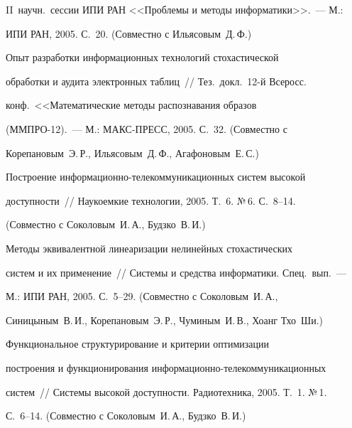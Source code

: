 II~научн.\ сессии ИПИ РАН <<Проблемы и методы информатики>>.~--- М.:


ИПИ РАН, 2005. С.~20. (Совместно с Ильясовым~Д.\,Ф.)





 Опыт разработки информационных технологий стохастической


обработки и аудита электронных таблиц~// Тез.\ докл.\ 12-й Всеросс.\


конф.\ <<Математические методы распознавания образов


 (ММПРО-12).~--- М.: МАКС-ПРЕСС, 2005. С.~32. (Совместно с


Корепановым~Э.\,Р., Ильясовым~Д.\,Ф., Агафоновым~Е.\,С.)





 Построение информационно-телекоммуникационных систем высокой


доступности~// Наукоемкие технологии, 2005. Т.~6. №\,6. С.~8--14.


(Совместно с Соколовым~И.\,А., Будзко~В.\,И.)





 Методы эквивалентной линеаризации нелинейных стохастических


систем и их применение~// Системы и средства информатики. Спец.\ вып.~---


М.: ИПИ РАН, 2005. С.~5--29. (Совместно с Соколовым~И.\,А.,


Синицыным~В.\,И., Корепановым~Э.\,Р., Чуминым~И.\,В., Хоанг Тхо~Ши.)
















 Функциональное структурирование и критерии оптимизации


построения и функционирования ин\-фор\-ма\-ци\-он\-но-те\-ле\-ком\-му\-ни\-ка\-ци\-он\-ных


систем~// Системы высокой доступности. Радиотехника, 2005. Т.~1. №\,1.


С.~6--14. (Совместно с Соколовым~И.\,А., Будзко~В.\,И.)


